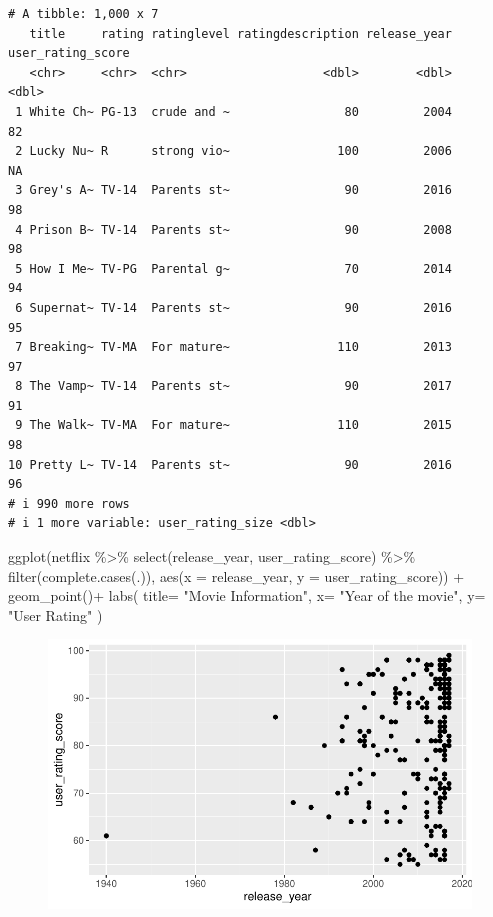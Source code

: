 \documentclass[
  letterpaper,
  DIV=11,
  numbers=noendperiod]{scrreprt}
\newenvironment{Shaded}{\begin{snugshade}}{\end{snugshade}}
\newcommand{\AttributeTok}[1]{\textcolor[rgb]{0.40,0.45,0.13}{#1}}
\newcommand{\FunctionTok}[1]{\textcolor[rgb]{0.28,0.35,0.67}{#1}}
\newcommand{\NormalTok}[1]{\textcolor[rgb]{0.00,0.23,0.31}{#1}}
\newcommand{\SpecialCharTok}[1]{\textcolor[rgb]{0.37,0.37,0.37}{#1}}
\newcommand{\StringTok}[1]{\textcolor[rgb]{0.13,0.47,0.30}{#1}}
\begin{document}
\begin{verbatim}
# A tibble: 1,000 x 7
   title     rating ratinglevel ratingdescription release_year user_rating_score
   <chr>     <chr>  <chr>                   <dbl>        <dbl>             <dbl>
 1 White Ch~ PG-13  crude and ~                80         2004                82
 2 Lucky Nu~ R      strong vio~               100         2006                NA
 3 Grey's A~ TV-14  Parents st~                90         2016                98
 4 Prison B~ TV-14  Parents st~                90         2008                98
 5 How I Me~ TV-PG  Parental g~                70         2014                94
 6 Supernat~ TV-14  Parents st~                90         2016                95
 7 Breaking~ TV-MA  For mature~               110         2013                97
 8 The Vamp~ TV-14  Parents st~                90         2017                91
 9 The Walk~ TV-MA  For mature~               110         2015                98
10 Pretty L~ TV-14  Parents st~                90         2016                96
# i 990 more rows
# i 1 more variable: user_rating_size <dbl>
\end{verbatim}

\begin{Shaded}
\begin{Highlighting}[]
\FunctionTok{ggplot}\NormalTok{(netflix }\SpecialCharTok{\%\textgreater{}\%} \FunctionTok{select}\NormalTok{(release\_year, user\_rating\_score) }\SpecialCharTok{\%\textgreater{}\%}
\FunctionTok{filter}\NormalTok{(}\FunctionTok{complete.cases}\NormalTok{(.)), }
\FunctionTok{aes}\NormalTok{(}\AttributeTok{x =}\NormalTok{ release\_year, }\AttributeTok{y =}\NormalTok{ user\_rating\_score)) }\SpecialCharTok{+} 
\FunctionTok{geom\_point}\NormalTok{()}\SpecialCharTok{+}
\FunctionTok{labs}\NormalTok{(}
  \AttributeTok{title=} \StringTok{"Movie Information"}\NormalTok{,}
  \AttributeTok{x=} \StringTok{"Year of the movie"}\NormalTok{,}
  \AttributeTok{y=} \StringTok{"User Rating"}
\NormalTok{  )}
\end{Highlighting}
\end{Shaded}

\begin{figure}[H]

{\centering \includegraphics{inclass2_files/figure-pdf/unnamed-chunk-3-1.pdf}

}

\end{figure}
\end{document}
